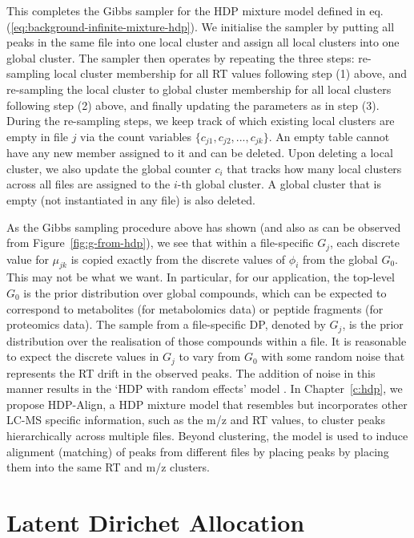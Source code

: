 This completes the Gibbs sampler for the HDP mixture model defined in eq. (\ref{eq:background-infinite-mixture-hdp}). We initialise the sampler by putting all peaks in the same file into one local cluster and assign all local clusters into one global cluster. The sampler then operates by repeating the three steps: re-sampling local cluster membership for all RT values following step (1) above, and re-sampling the local cluster to global cluster membership for all local clusters following step (2) above, and finally updating the parameters as in step (3). During the re-sampling steps, we keep track of which existing local clusters are empty in file $j$ via the count variables $\{c_{j1}, c_{j2}, ..., c_{jk}\}$. An empty table cannot have any new member assigned to it and can be deleted. Upon deleting a local cluster, we also update the global counter $c_{i}$ that tracks how many local clusters across all files are assigned to the $i$-th global cluster. A global cluster that is empty (not instantiated in any file) is also deleted. 

As the Gibbs sampling procedure above has shown (and also as can be observed from Figure~\ref{fig:g-from-hdp}), we see that within a file-specific $G_j$, each discrete value for $\mu_{jk}$ is copied exactly from the discrete values of $\phi_i$ from the global $G_0$. This may not be what we want. In particular, for our application, the top-level $G_0$ is the prior distribution over global compounds, which can be expected to correspond to metabolites (for metabolomics data) or peptide fragments (for proteomics data). The sample from a file-specific DP, denoted by $G_j$, is the prior distribution over the realisation of those compounds within a file. It is reasonable to expect the discrete values in $G_j$ to vary from $G_0$ with some random noise that represents the RT drift in the observed peaks. The addition of noise in this manner results in the `HDP with random effects' model \cite{kim2006hierarchical}. In Chapter~\ref{c:hdp}, we propose HDP-Align, a HDP mixture model that resembles \cite{kim2006hierarchical} but incorporates other LC-MS specific information, such as the m/z and RT values, to cluster peaks hierarchically across multiple files. Beyond clustering, the model is used to induce alignment (matching) of peaks from different files by placing peaks by placing them into the same RT and m/z clusters.

\section{Latent Dirichet Allocation\label{background-lda}}

